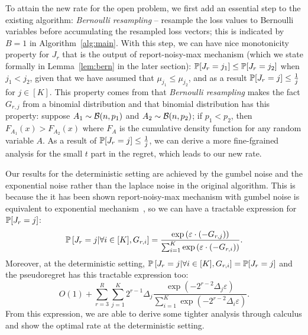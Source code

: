 To attain the new rate for the open problem, we first add an essential step to the existing algorithm: \textit{Bernoulli resampling} -- resample the loss values to Bernoulli variables before accumulating the resampled loss vectors; this is indicated by $B=1$ in Algorithm~\ref{alg:main}.
With this step, we can have nice monotonicity property for $J_r$ that is the output of report-noisy-max mechanism (which we state formally in Lemma~\ref{lem:bern} in the later section): $\mathbb{P}[J_r=j_1]\leq \mathbb{P}[J_r=j_2]$ when $j_1 < j_2$, given that we have assumed that $\mu_{j_1}\leq \mu_{j_2}$, and as a result $\mathbb{P}[J_r=j]\leq \frac{1}{j}$ for $j\in [K]$. 
This property comes from that \textit{Bernoulli resampling} makes the fact $G_{r,j}$ from a binomial distribution and that binomial distribution has this property: suppose $A_1\sim \mathcal{B}(n, p_1)$ and $A_2\sim \mathcal{B}(n, p_2)$; if $p_1 < p_2$, then $F_{A_1}(x)> F_{A_2}(x) $ where $F_A$ is the cumulative density function for any random variable $A$.
As a result of $\mathbb{P}[J_r=j]\leq \frac{1}{j}$, we can derive a more fine-fgrained analysis for the small $t$ part in the regret, which leads to our new rate.

Our results for the deterministic setting are achieved by the gumbel noise and the exponential noise rather than the laplace noise in the original algorithm.
This is because the it has been shown report-noisy-max mechanism with gumbel noise is equivalent to exponential mechanism~\citep{gumbel1954statistical, qiao2021oneshot}, so we can have a tractable expression for $\mathbb{P}[J_r=j]$:
$$\mathbb{P}\left[J_r = j|\forall i\in [K], G_{r, i} \right] = \frac{\exp\left( \varepsilon\cdot (-G_{r, j} ) \right)}{\sum_{i=1}^K\exp\left( \varepsilon\cdot (-G_{r, i}) \right)}.$$
Moreover, at the deterministic setting, $\mathbb{P}\left[J_r = j|\forall i\in [K], G_{r, i} \right] = \mathbb{P}[J_r=j]$ and the pseudoregret has this tractable expression too:
$$
O(1) + \sum_{r=3}^{R} \sum_{j=1}^{K}2^{r-1}\Delta_{j}\frac{\exp\left( -2^{r-2}\Delta_j\varepsilon \right)}{\sum_{i=1}^K\exp\left( -2^{r-2}\Delta_i\varepsilon\right)}.
$$
From this expression, we are able to derive some tighter analysis through calculus and show the optimal rate at the deterministic setting.

%

